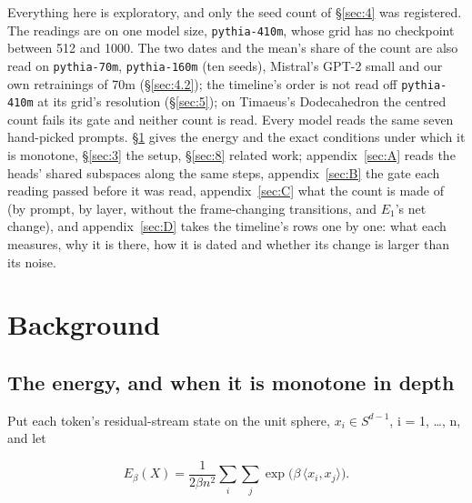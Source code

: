 \documentclass[11pt]{article}
\begin{document}
Everything here is exploratory, and only the seed count of \S\ref{sec:4} was registered. The readings are on one model size, \texttt{pythia-410m}, whose grid has no checkpoint between 512 and 1000. The two dates and the mean's share of the count are also read on \texttt{pythia-70m}, \texttt{pythia-160m} (ten seeds), Mistral's GPT-2 small and our own retrainings of 70m (\S\ref{sec:4.2}); the timeline's order is not read off \texttt{pythia-410m} at its grid's resolution (\S\ref{sec:5}); on Timaeus's Dodecahedron the centred count fails its gate and neither count is read. Every model reads the same seven hand-picked prompts. \S\ref{sec:2} gives the energy and the exact conditions under which it is monotone, \S\ref{sec:3} the setup, \S\ref{sec:8} related work; appendix~\ref{sec:A} reads the heads' shared subspaces along the same steps, appendix~\ref{sec:B} the gate each reading passed before it was read, appendix~\ref{sec:C} what the count is made of (by prompt, by layer, without the frame-changing transitions, and $E_{1}$'s net change), and appendix~\ref{sec:D} takes the timeline's rows one by one: what each measures, why it is there, how it is dated and whether its change is larger than its noise.

\section{Background}\label{sec:2}

\subsection{The energy, and when it is monotone in depth}\label{sec:2.1}

Put each token's residual-stream state on the unit sphere, $x_{i} \in S^{d-1}$, i = 1, \dots{}, n, and let

\begin{equation}
E_\beta(X) = \frac{1}{2\beta n^2}\sum_{i}\sum_{j}\exp\bigl(\beta\,\langle x_i, x_j\rangle\bigr).
\end{equation}
\end{document}
